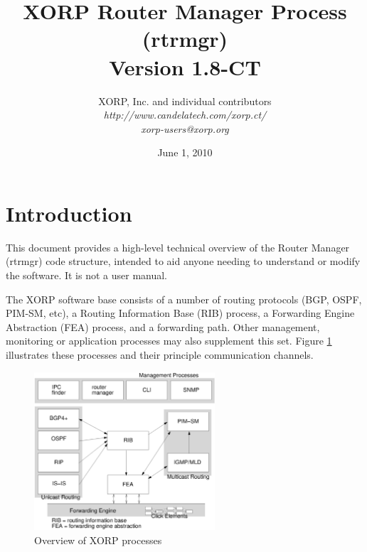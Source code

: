 \documentclass[11pt]{article}
\begin{document}
\title{XORP Router Manager Process (rtrmgr) \\
\vspace{1ex}
Version 1.8-CT}
\author{ XORP, Inc. and individual contributors		\\
         {\it http://www.candelatech.com/xorp.ct/}			\\
	 {\it xorp-users@xorp.org}
}
\date{June 1, 2010}

\maketitle


\section{Introduction}

This document provides a high-level technical overview of the Router
Manager (rtrmgr) code structure, intended to aid anyone needing to
understand or modify the software.   It is not a user manual.

The XORP software base consists of a number of routing protocols (BGP,
OSPF, PIM-SM, etc), a Routing Information Base (RIB) process, a
Forwarding Engine Abstraction (FEA) process, and a forwarding path.
Other management, monitoring or application processes may also
supplement this set.  Figure \ref{overview} illustrates these
processes and their principle communication channels.

\begin{figure}[htb]
\centerline{\includegraphics[width=0.6\textwidth]{figs/processes3}}
\vspace{.05in}
\caption{\label{overview}Overview of XORP processes}
\end{figure}
\end{document}
